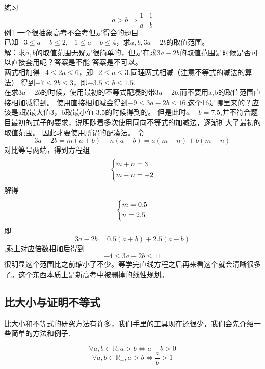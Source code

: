练习 \[a>b\Rightarrow \frac{1}{a}\_\_\frac{1}{b}\]
例1 一个很抽象高考不会考但是得会的题目
\\已知$-3\leq a+b\leq2,-1\leq a-b\leq 4$，求$a,b,3a-2b$的取值范围。
\\解：求$a,b$的取值范围无疑是很简单的，但是在求$3a-2b$的取值范围是时候是否可以直接套用呢？答案是不能
答案是不可以。
\\两式相加得$-4\leq 2a \leq 6$，即$-2\leq a \leq 3$.同理两式相减（注意不等式的减法的算法）
得到$-7\leq 2b\leq 3$，即$-3.5\leq b\leq 1.5$.
\\在求$3a-2b$的时候，使用最初的不等式配凑的带$3a-2b$,而不要用a,b的取值范围直接相加减得到。
使用直接相加减会得到$-9\leq 3a-2b\leq16$,这个16是哪里来的？应该是a取最大值3，b取最小值-3.5的时候得到的。
但是此时$a-b=7.5$,并不符合题目最初的式子的要求，说明随着多次使用同向不等式的加减法，逐渐扩大了最初的取值范围。
因此才要使用所谓的配凑法。
令\[3a-2b=m(a+b)+n(a-b)=a(m+n)+b(m-n)\]
对比等号两端，得到方程组
\[  
    \left\{
    \begin{lgathered}
    m+n=3\\
    m-n=-2
    \end{lgathered}
    \right.
\]
解得
\[  
    \left\{
    \begin{lgathered}
    m=0.5\\
    n=2.5
    \end{lgathered}
    \right.
\]
即\[3a-2b=0.5(a+b)+2.5(a-b)\],乘上对应倍数相加后得到
\[-4\leq 3a-2b\leq11\]
很明显这个范围比之前缩小了不少。等学完直线方程之后再来看这个就会清晰很多了。这个东西本质上是新高考中被删掉的线性规划。
\subsection{比大小与证明不等式}
比大小和不等式的研究方法有许多，我们手里的工具现在还很少，我们会先介绍一些简单的方法和例子.
\begin{theorem}\label{bidaxiao}
    \[\forall a,b\in\mathbb{R},a>b\Leftrightarrow a-b>0\]
    \[\forall a,b\in\mathbb{R}_+,a>b\Leftrightarrow \frac{a}{b}>1\]
\end{theorem}

